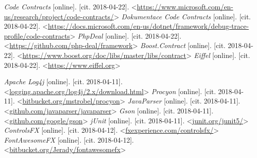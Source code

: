 \begin{thebibliography}{99}
 {\it Code Contracts} [online]. [cit. 2018-04-22]. \textless\url{https://www.microsoft.com/en-us/research/project/code-contracts/}\textgreater
{} {\it Dokumentace Code Contracts} [online]. [cit. 2018-04-22]. \textless\url{https://docs.microsoft.com/en-us/dotnet/framework/debug-trace-profile/code-contracts}\textgreater
{} {\it PhpDeal} [online]. [cit. 2018-04-22]. \textless\url{https://github.com/php-deal/framework}\textgreater
{} {\it Boost.Contract} [online]. [cit. 2018-04-22]. \textless\url{https://www.boost.org/doc/libs/master/libs/contract}\textgreater
{} {\it Eiffel} [online]. [cit. 2018-04-22]. \textless\url{https://www.eiffel.org}\textgreater


 {\it Apache Log4j} [online]. [cit. 2018-04-11]. \textless\url{logging.apache.org/log4j/2.x/download.html}\textgreater
{} {\it Procyon} [online]. [cit. 2018-04-11]. \textless\url{bitbucket.org/mstrobel/procyon}\textgreater
{} {\it JavaParser} [online]. [cit. 2018-04-11]. \textless\url{github.com/javaparser/javaparser}\textgreater
{} {\it Gson} [online]. [cit. 2018-04-11]. \textless\url{github.com/google/gson}\textgreater
{} {\it jUnit} [online]. [cit. 2018-04-11]. \textless\url{junit.org/junit5/}\textgreater
{} {\it ControlsFX} [online]. [cit. 2018-04-12]. \textless\url{fxexperience.com/controlsfx/}\textgreater
{} {\it FontAwesomeFX} [online]. [cit. 2018-04-12]. \textless\url{bitbucket.org/Jerady/fontawesomefx}\textgreater




\end{thebibliography}
